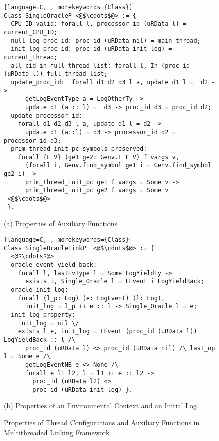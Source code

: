 \begin{figure}
\begin{lstlisting}[language=C, , morekeywords={Class}]
Class SingleOracleP <@$\cdots$@> := {
  CPU_ID_valid: forall l, processor_id (uRData l) = current_CPU_ID;
  null_log_proc_id: proc_id (uRData nil) = main_thread;
  init_log_proc_id: proc_id (uRData init_log) = current_thread;
  all_cid_in_full_thread_list: forall l, In (proc_id (uRData l)) full_thread_list;
  update_proc_id:  forall d1 d2 d3 l a, update d1 l =  d2 ->
      getLogEventType a = LogOtherTy ->
      update d1 (a :: l) =  d3 -> proc_id d3 = proc_id d2;
  update_processor_id:
    forall d1 d2 d3 l a, update d1 l = d2 -> 
      update d1 (a::l) = d3 -> processor_id d2 = processor_id d3;   
  prim_thread_init_pc_symbols_preserved:
    forall {F V} (ge1 ge2: Genv.t F V) f vargs v,
      (forall i, Genv.find_symbol ge1 i = Genv.find_symbol ge2 i) ->
      prim_thread_init_pc ge1 f vargs = Some v ->
      prim_thread_init_pc ge2 f vargs = Some v
 <@$\cdots$@>      
 }.
\end{lstlisting}
\begin{center}
(a) Properties of Auxiliary Functions
\end{center}

\begin{lstlisting}[language=C, , morekeywords={Class}]
Class SingleOracleLinkP  <@$\cdots$@> := {
  <@$\cdots$@>
  oracle_event_yield_back:
    forall l, lastEvType l = Some LogYieldTy ->
      exists i, Single_Oracle l = LEvent i LogYieldBack;
  oracle_init_log:
    forall (l_p: Log) (e: LogEvent) (l: Log),
      init_log = l_p ++ e :: l -> Single_Oracle l = e;
  init_log_property:
    init_log = nil \/
    exists l e, init_log = LEvent (proc_id (uRData l)) LogYieldBack :: l /\
      proc_id (uRData l) <> proc_id (uRData nil) /\ last_op l = Some e /\
      getLogEventNB e <> None /\
      forall e l1 l2, l = l1 ++ e :: l2 ->
        proc_id (uRData l2) <> 
        proc_id (uRData init_log) }.
\end{lstlisting}
\begin{center}
(b) Properties of an Environmental Context and an Initial Log.
\end{center}
\caption{Properties of Thread Configurations and Auxiliary Functions in Multithreaded Linking Framework}	
\label{fig:chapter:conlink:multithreaded-configuration-props}
\end{figure}

